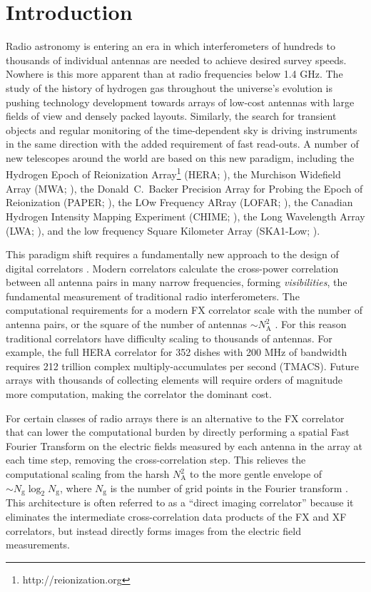 \documentclass[a4paper,fleqn,usenatbib]{mnras}
\newcommand{\Nant}{N_\textrm{A}}
\newcommand{\Ngrid}{N_\textrm{g}}
\begin{document}
\section{Introduction}

Radio astronomy is entering an era in which interferometers of hundreds to thousands of individual antennas are needed to achieve desired survey speeds. Nowhere is this more apparent than at radio frequencies below 1.4 GHz. The study of the history of hydrogen gas throughout the universe's evolution is pushing technology development towards arrays of low-cost antennas with large fields of view and densely packed layouts. Similarly, the search for transient objects and regular monitoring of the time-dependent sky is driving instruments in the same direction with the added requirement of fast read-outs. A number of new telescopes around the world are based on this new paradigm, including the Hydrogen Epoch of Reionization Array\footnote{http://reionization.org} (HERA; \citealt{deb16}), the Murchison Widefield Array (MWA; \citealt{tin13,bow13}), the Donald~C.~Backer Precision Array for Probing the Epoch of Reionization (PAPER; \citealt{par10}), the LOw Frequency ARray (LOFAR; \citealt{van13}), the Canadian Hydrogen Intensity Mapping Experiment (CHIME; \citealt{ban14}), the Long Wavelength Array (LWA; \citealt{ell13}), and the low frequency Square Kilometer Array (SKA1-Low; \citealt{mel13}).

This paradigm shift requires a fundamentally new approach to the design of digital correlators \citep{lon00}. Modern correlators calculate the cross-power correlation between all antenna pairs in many narrow frequencies, forming \emph{visibilities}, the fundamental measurement of traditional radio interferometers. The computational requirements for a modern FX correlator scale with the number of antenna pairs, or the square of the number of antennas $\sim \Nant^2$ \citep{bun04}. For this reason traditional correlators have difficulty scaling to thousands of antennas. For example, the full HERA correlator for 352 dishes with 200 MHz of bandwidth requires 212 trillion complex multiply-accumulates per second (TMACS). Future arrays with thousands of collecting elements will require orders of magnitude more computation, making the correlator the dominant cost.

For certain classes of radio arrays there is an alternative to the FX correlator that can lower the computational burden by directly performing a spatial Fast Fourier Transform \citep[FFT;][]{coo65} on the electric fields measured by each antenna in the array at each time step, removing the cross-correlation step. This relieves the computational scaling from the harsh $\Nant^2$ to the more gentle envelope of $\sim\Ngrid\log_2\Ngrid$, where $\Ngrid$ is the number of grid points in the Fourier transform \citep[e.g.][]{mor11,teg09,teg10}. This architecture is often referred to as a ``direct imaging correlator'' because it eliminates the intermediate cross-correlation data products of the FX and XF correlators, but instead directly forms images from the electric field measurements.
\end{document}
